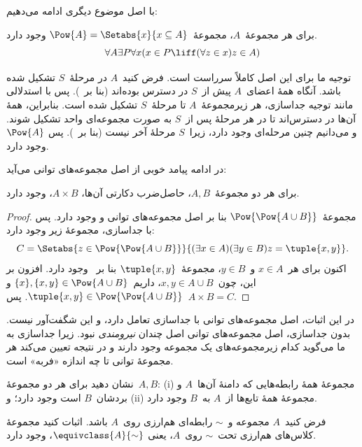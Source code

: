 \documentclass[../../../include/open-logic-section]{subfiles}
\begin{document}

با اصل موضوع دیگری ادامه می‌دهیم:

\begin{axiom}
برای هر مجموعهٔ~$A$، مجموعهٔ~$\Pow{A} = \Setabs{x}{x \subseteq A}$ وجود دارد.
\[
	\forall A \exists P \forall x(x \in P \liff (\forall z \in x)z \in A)
\]
\end{axiom}

توجیه ما برای این اصل کاملاً سرراست است. فرض کنید~$A$ در مرحلهٔ~$S$
تشکیل شده باشد. آنگاه همهٔ اعضای~$A$ پیش از~$S$ در دسترس بوده‌اند (بنا
بر~\stagesacc). پس با استدلالی مانند توجیه جداسازی، هر زیرمجموعهٔ~$A$ تا
مرحلهٔ~$S$ تشکیل شده است. بنابراین، همهٔ آن‌ها در دسترس‌اند تا در هر
مرحلهٔ پس از~$S$ به صورت مجموعه‌ای واحد تشکیل شوند. و می‌دانیم چنین
مرحله‌ای وجود دارد، زیرا~$S$ مرحلهٔ آخر نیست (بنا بر~\stagessucc). پس
$\Pow{A}$ وجود دارد.

در ادامه پیامد خوبی از اصل مجموعه‌های توانی می‌آید:

\begin{prop}\label{thm:Products}
برای هر دو مجموعهٔ~$A,B$، حاصل‌ضرب دکارتی آن‌ها، $A \times B$، وجود دارد.
\end{prop}

\begin{proof}
مجموعهٔ~$\Pow{\Pow{A \cup B}}$ بنا بر اصل مجموعه‌های توانی و
 وجود دارد. پس با جداسازی،
مجموعهٔ زیر وجود دارد:
\[
	C = \Setabs{z \in \Pow{\Pow{A \cup B}}}{(\exists x \in A)(\exists y \in B) z = \tuple{x, y}}.
\]
اکنون برای هر~$x \in A$ و~$y \in B$، مجموعهٔ~$\tuple{x,y}$ بنا
بر~ وجود دارد. افزون بر این،
چون~$x,y \in A \cup B$، داریم~$\{x\},\{x,y\} \in \Pow{A \cup B}$ و
$\tuple{x,y} \in \Pow{\Pow{A \cup B}}$. پس~$A \times B = C$.
\end{proof}

در این اثبات، اصل مجموعه‌های توانی با جداسازی تعامل دارد، و این
شگفت‌آور نیست. بدون جداسازی، اصل مجموعه‌های توانی اصل چندان
\emph{نیرومندی} نبود. زیرا جداسازی به ما می‌گوید کدام زیرمجموعه‌های یک
مجموعه وجود دارند و در نتیجه تعیین می‌کند هر مجموعهٔ توانی تا چه اندازه
«فربه» است.

\begin{prob}
نشان دهید برای هر دو مجموعهٔ~$A,B$: (i) مجموعهٔ همهٔ رابطه‌هایی که دامنهٔ
آن‌ها~$A$ و بردشان~$B$ است وجود دارد؛ و (ii) مجموعهٔ همهٔ تابع‌ها از~$A$
به~$B$ وجود دارد.
\end{prob}

\begin{prob}
فرض کنید~$A$ مجموعه و~$\sim$ رابطه‌ای هم‌ارزی روی~$A$ باشد. اثبات کنید
مجموعهٔ کلاس‌های هم‌ارزی تحت~$\sim$ روی~$A$، یعنی
$\equivclass{A}{\sim}$، وجود دارد.
\end{prob}
\end{document}
